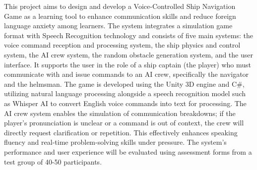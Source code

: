This project aims to design and develop a Voice-Controlled Ship Navigation Game as a learning tool to enhance communication skills and reduce foreign language anxiety among learners. The system integrates a simulation game format with Speech Recognition technology and consists of five main systems: the voice command reception and processing system, the ship physics and control system, the AI crew system, the random obstacle generation system, and the user interface. It supports the user in the role of a ship captain (the player) who must communicate with and issue commands to an AI crew, specifically the navigator and the helmsman. The game is developed using the Unity 3D engine and C\#, utilizing natural language processing alongside a speech recognition model such as Whisper AI to convert English voice commands into text for processing. The AI crew system enables the simulation of communication breakdowns; if the player's pronunciation is unclear or a command is out of context, the crew will directly request clarification or repetition. This effectively enhances speaking fluency and real-time problem-solving skills under pressure. The system's performance and user experience will be evaluated using assessment forms from a test group of 40-50 participants.
